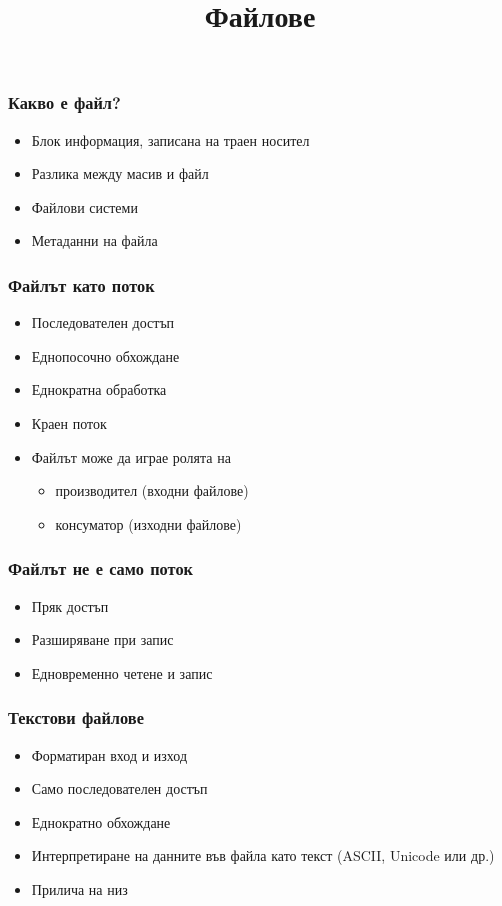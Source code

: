 \documentclass{beamer}
\title{Файлове}
\begin{document}
\begin{frame}
  \titlepage
\end{frame}

\begin{frame}
  \frametitle{Какво е файл?}

  \begin{itemize}
  \item Блок информация, записана на траен носител
  \item Разлика между масив и файл
  \item Файлови системи
  \item Метаданни на файла
  \end{itemize}
\end{frame}

\begin{frame}
  \frametitle{Файлът като поток}
  
  \begin{itemize}
  \item Последователен достъп
  \item Еднопосочно обхождане
  \item Еднократна обработка
  \item Краен поток
  \item Файлът може да играе ролята на
    \begin{itemize}
    \item производител (входни файлове)
    \item консуматор (изходни файлове)
    \end{itemize}
  \end{itemize}
\end{frame}

\begin{frame}
  \frametitle{Файлът не е само поток}

  \begin{itemize}
  \item Пряк достъп
  \item Разширяване при запис
  \item Едновременно четене и запис
  \end{itemize}
\end{frame}

\begin{frame}
  \frametitle{Текстови файлове}
  \begin{itemize}
  \item Форматиран вход и изход
  \item Само последователен достъп
  \item Еднократно обхождане
  \item Интерпретиране на данните във файла като текст (ASCII, Unicode или др.)
  \item Прилича на низ
  \end{itemize}
\end{frame}
\end{document}
